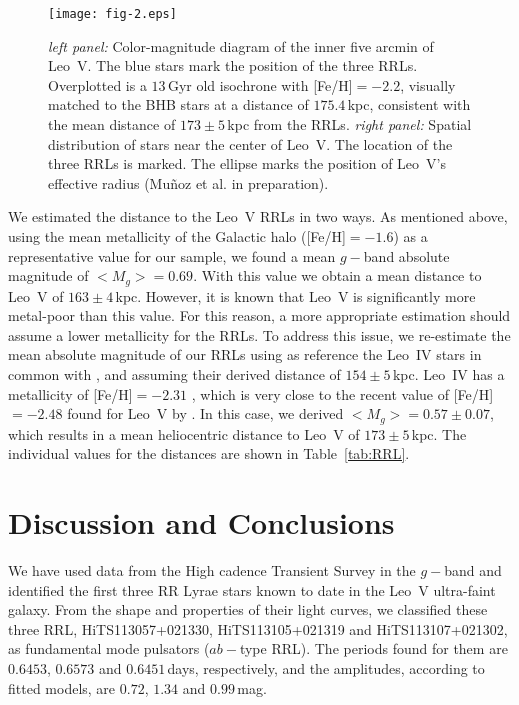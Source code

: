 \documentclass[iop]{emulateapj}
\begin{document}
\begin{figure*}
\texttt{[image: fig-2.eps]}
\caption{{\it left panel:} Color-magnitude diagram of the inner five arcmin of Leo~V. 
The blue stars mark the position of the three RRLs. Overplotted is a $13$\,Gyr old isochrone with [Fe/H]$=-2.2$, visually matched to the BHB stars at a distance of $175.4$\,kpc, consistent with the mean distance of $173\pm5$\,kpc from the RRLs. 
{\it right panel:} Spatial 
distribution of stars near the center of Leo~V. 
The location of the three RRLs is marked. 
The ellipse marks the position of Leo~V's effective radius (Mu\~noz et al. in preparation).}
\label{fig:pos-cmd}
\end{figure*}

We estimated the distance to the Leo~V RRLs in two ways.
As mentioned above, using the mean metallicity of the Galactic halo ([Fe/H]$=-1.6$) as a representative value for our sample, we found a mean $g-$band absolute magnitude of $<M_{g}>=0.69$.
With this value we obtain a mean distance to Leo~V of $163 \pm 4$\,kpc.  
However, it is known that Leo~V is significantly more metal-poor than this value. 
For this reason, a more appropriate estimation should assume a lower metallicity for the RRLs. 
To address this issue, we re-estimate the mean absolute magnitude of our RRLs using as reference the Leo~IV stars in common with \citet{Moretti2009}, and assuming their derived distance of $154\pm5$\,kpc.
Leo~IV has a metallicity of [Fe/H]$=-2.31$ \citep{Simon2007}, which is very close to the recent value of [Fe/H]$=-2.48$ found for Leo~V by \citet{Collins2016}. 
In this case, we derived $<M_g>=0.57\pm 0.07$, which results in a mean heliocentric distance to Leo~V  of $173\pm5$\,kpc.
The individual values for the distances are shown in Table~\ref{tab:RRL}.


\section{Discussion and Conclusions}
    
We have used data from the High cadence Transient Survey in the $g-$band and identified the first three RR Lyrae stars known to date in the Leo~V ultra-faint galaxy. 
From the shape and properties of their light curves, we classified these three RRL, HiTS113057+021330, HiTS113105+021319 and HiTS113107+021302, as fundamental mode pulsators ($ab-$type RRL). 
The periods found for them are $0.6453$, $0.6573$ and $0.6451$\,days, respectively, and the amplitudes, according to fitted models, are $0.72$, $1.34$ and $0.99$\,mag. 
\end{document}
